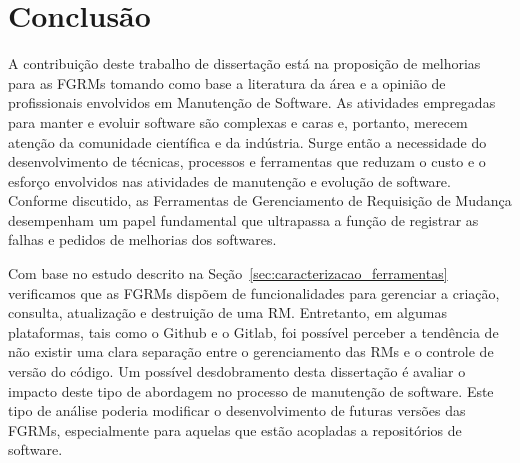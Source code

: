 \chapter{Conclusão}
\label{ch:conclusao_trab_futuros}

A contribuição deste trabalho de dissertação está na proposição de melhorias
para as FGRMs tomando como base a literatura da área e a opinião de
profissionais envolvidos em Manutenção de Software. As atividades empregadas
para manter e evoluir software são complexas e caras e, portanto, merecem
atenção da comunidade científica e da indústria. Surge então a necessidade do
desenvolvimento de técnicas, processos e ferramentas que reduzam o custo e o
esforço envolvidos nas atividades de manutenção e evolução de software. Conforme
discutido, as Ferramentas de Gerenciamento de Requisição de Mudança desempenham
um papel fundamental que ultrapassa a função de registrar as falhas e pedidos de
melhorias dos softwares.

Com base no estudo descrito na Seção~\ref{sec:caracterizacao_ferramentas}
verificamos que as FGRMs dispõem de funcionalidades para gerenciar a criação,
consulta, atualização e destruição de uma RM\@. Entretanto, em algumas
plataformas, tais como o Github e o Gitlab, foi possível perceber a tendência
de não existir uma clara separação entre o gerenciamento das RMs e o controle
de versão do código. Um possível desdobramento desta dissertação é avaliar o
impacto deste tipo de abordagem no processo de manutenção de software. Este
tipo de análise poderia modificar o desenvolvimento de futuras versões das
FGRMs, especialmente para aquelas que estão acopladas a repositórios de
software.

